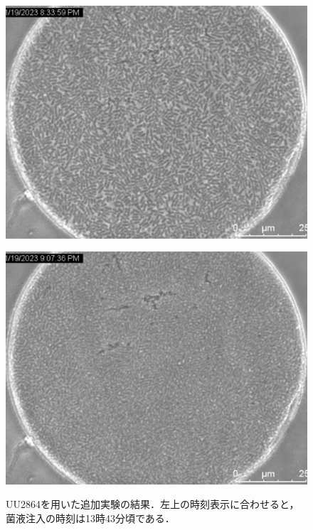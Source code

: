 \documentclass[a4paper,11pt,titlepage]{jsarticle}
\begin{document}
\begin{figure}[htbp]
\begin{minipage}{0.45\linewidth}
    \label{fig:64_2_m9}
  \end{minipage}
  \begin{minipage}{0.45\linewidth}
    \centering
    \includegraphics[width=\columnwidth]{Series011_t000000.pdf}
    \label{fig:64_3_m9}
  \end{minipage}
  \begin{minipage}{0.45\linewidth}
    \centering
    \includegraphics[width=\columnwidth]{Series011_t020000.pdf}
    \label{fig:64_4_m9}
  \end{minipage}
  \caption{UU2864を用いた追加実験の結果．左上の時刻表示に合わせると，菌液注入の時刻は13時43分頃である．}
\end{figure}
\end{document}
